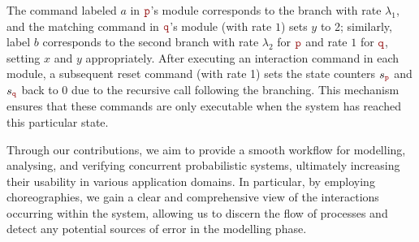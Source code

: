 %
%
%
The command labeled \(a\) in \(\role{p}\)’s module corresponds to the
branch with rate \(\lambda_1\), and the matching command in
\(\role{q}\)’s module (with rate \(1\)) sets \(y\) to 2; similarly,
label \(b\) corresponds to the second branch with rate \(\lambda_2\)
for \(\role{p}\) and rate \(1\) for \(\role{q}\), setting \(x\) and
\(y\) appropriately.  After executing an interaction command in each
module, a subsequent reset command (with rate 1) sets the state
counters \( s_{\role p} \) and \( s_{\role q} \) back to 0 due to the
recursive call following the branching. This mechanism ensures that
these commands are only executable when the system has reached this
particular state.



Through our contributions, we aim to provide a smooth workflow for
modelling, analysing, and verifying concurrent probabilistic systems,
ultimately increasing their usability in various application domains.
%
In particular, by employing choreographies, we gain a clear and
comprehensive view of the interactions occurring within the system,
allowing us to discern the flow of processes and detect any potential
sources of error in the modelling phase.


